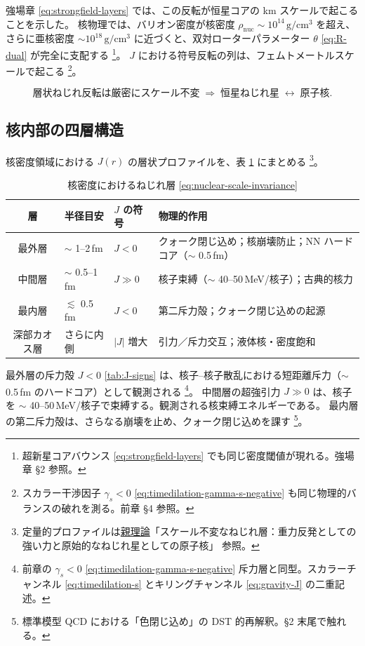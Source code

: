 \documentclass[dvipdfmx,a4paper,oneside]{jsbook}
\numberwithin{equation}{chapter}
\begin{document}
強場章 \eqref{eq:strongfield-layers} では、この反転が恒星コアの km スケールで起こることを示した。
核物理では、バリオン密度が核密度 \(\rho_{\mathrm{nuc}} \sim 10^{14}\,\mathrm{g/cm^3}\) を超え、さらに亜核密度 \(\sim 10^{18}\,\mathrm{g/cm^3}\) に近づくと、双対ローターパラメーター \(\theta\) \eqref{eq:R-dual} が完全に支配する \footnote{超新星コアバウンス \eqref{eq:strongfield-layers} でも同じ密度閾値が現れる。強場章 §2 参照。}。
\(J\) における符号反転の列は、フェムトメートルスケールで起こる \footnote{スカラー干渉因子 \(\gamma_s < 0\) \eqref{eq:timedilation-gamma-s-negative} も同じ物理的バランスの破れを測る。前章 §4 参照。}。

\begin{equation}
  \boxed{\;
  \text{層状ねじれ反転は厳密にスケール不変}
  \;\Rightarrow\;
  \text{恒星ねじれ星} \;\leftrightarrow\; \text{原子核}.
  \;}
  \label{eq:nuclear-scale-invariance}
\end{equation}

\subsection{核内部の四層構造}

核密度領域における \(J(r)\) の層状プロファイルを、表 \ref{tab:nuclear-layers} にまとめる \footnote{定量的プロファイルは\hyperref[sec:sister-manuscripts]{親理論}「スケール不変なねじれ層：重力反発としての強い力と原始的なねじれ星としての原子核」 参照。}。

\begin{table}[htbp]
  \centering
  \caption{核密度におけるねじれ層 \eqref{eq:nuclear-scale-invariance}}
  \label{tab:nuclear-layers}
  \begin{tabular}{@{}clll@{}}
    \toprule
    層 & 半径目安 & \(J\) の符号 & 物理的作用 \\
    \midrule
    最外層 & \(\sim\) 1--2\,fm & \(J < 0\) & クォーク閉じ込め；核崩壊防止；NN ハードコア（\(\sim\) 0.5\,fm） \\
    中間層 & \(\sim\) 0.5--1\,fm & \(J \gg 0\) & 核子束縛（\(\sim\) 40--50\,MeV/核子）；古典的核力 \\
    最内層 & \(\lesssim\) 0.5\,fm & \(J < 0\) & 第二斥力殻；クォーク閉じ込めの起源 \\
    深部カオス層 & さらに内側 & \(|J|\) 増大 & 引力／斥力交互；液体核・密度飽和 \\
    \bottomrule
  \end{tabular}
\end{table}

最外層の斥力殻 \(J < 0\) \eqref{tab:J-signs} は、核子--核子散乱における短距離斥力（\(\sim\) 0.5\,fm のハードコア）として観測される \footnote{前章の \(\gamma_s < 0\) \eqref{eq:timedilation-gamma-s-negative} 斥力層と同型。スカラーチャンネル \eqref{eq:timedilation-s} とキリングチャンネル \eqref{eq:gravity-J} の二重記述。}。
中間層の超強引力 \(J \gg 0\) は、核子を \(\sim\) 40--50\,MeV/核子で束縛する。観測される核束縛エネルギーである。
最内層の第二斥力殻は、さらなる崩壊を止め、クォーク閉じ込めを課す \footnote{標準模型 QCD における「色閉じ込め」の DST 的再解釈。§2 末尾で触れる。}。
\end{document}
